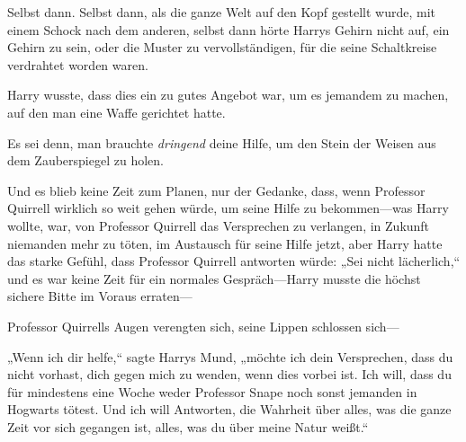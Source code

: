 \later


Selbst dann. Selbst dann, als die ganze Welt auf den Kopf gestellt wurde, mit einem Schock nach dem anderen, selbst dann hörte Harrys Gehirn nicht auf, ein Gehirn zu sein, oder die Muster zu vervollständigen, für die seine Schaltkreise verdrahtet worden waren.

Harry wusste, dass dies ein zu gutes Angebot war, um es jemandem zu machen, auf den man eine Waffe gerichtet hatte.

Es sei denn, man brauchte \emph{dringend} deine Hilfe, um den Stein der Weisen aus dem Zauberspiegel zu holen.

Und es blieb keine Zeit zum Planen, nur der Gedanke, dass, wenn Professor Quirrell wirklich so weit gehen würde, um seine Hilfe zu bekommen—was Harry wollte, war, von Professor Quirrell das Versprechen zu verlangen, in Zukunft niemanden mehr zu töten, im Austausch für seine Hilfe jetzt, aber Harry hatte das starke Gefühl, dass Professor Quirrell antworten würde: „Sei nicht lächerlich,“ und es war keine Zeit für ein normales Gespräch—Harry musste die höchst sichere Bitte im Voraus erraten—

Professor Quirrells Augen verengten sich, seine Lippen schlossen sich—

„Wenn ich dir helfe,“ sagte Harrys Mund, „möchte ich dein Versprechen, dass du nicht vorhast, dich gegen mich zu wenden, wenn dies vorbei ist. Ich will, dass du für mindestens eine Woche weder Professor Snape noch sonst jemanden in Hogwarts tötest. Und ich will Antworten, die Wahrheit über alles, was die ganze Zeit vor sich gegangen ist, alles, was du über meine Natur weißt.“

